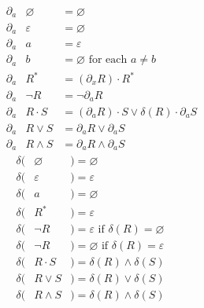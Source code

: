 \documentclass[runningheads]{llncs}
\begin{document}
\begin{multicols}{2}
  \begin{eqnarray*}
    \phantom{--}\partial_a & \varnothing & = \varnothing                                           \\
    \phantom{--}\partial_a & \varepsilon & = \varnothing                                           \\
    \phantom{--}\partial_a & a           & = \varepsilon                                           \\
    \phantom{--}\partial_a & b           & = \varnothing  \text{ for each } a \neq b               \\
    \phantom{--}\partial_a & R^*         & = (\partial_x R)\cdot R^*                               \\
    \phantom{--}\partial_a & \neg R      & = \neg \partial_a R                                     \\
    \phantom{--}\partial_a & R\cdot S    & = (\partial_a R)\cdot S \vee \delta(R)\cdot\partial_a S \\
    \phantom{--}\partial_a & R\vee S     & = \partial_a R \vee \partial_a S                        \\
    \phantom{--}\partial_a & R\land S    & = \partial_a R \land \partial_a S
  \end{eqnarray*} \break\vspace{-0.45cm}
  \begin{eqnarray*}
    \delta(& \varnothing &)= \varnothing                                      \\
    \delta(& \varepsilon &)= \varepsilon                                      \\
    \delta(& a           &)= \varnothing                                      \\
    \delta(& R^*         &)= \varepsilon                                      \\
    \delta(& \neg R      &)= \varepsilon \text{ if } \delta(R) = \varnothing  \\
    \delta(& \neg R      &)= \varnothing \text{ if } \delta(R) = \varepsilon  \\
    \delta(& R\cdot S    &)= \delta(R) \land \delta(S)                        \\
    \delta(& R\vee S     &)= \delta(R) \vee  \delta(S)                        \\
    \delta(& R\land S    &)= \delta(R) \land \delta(S)
  \end{eqnarray*}
\end{multicols}
\end{document}
